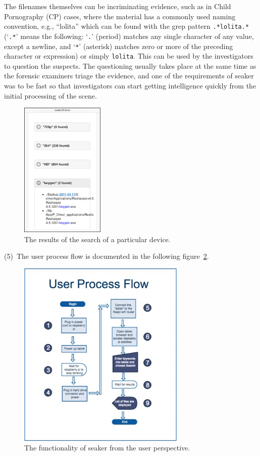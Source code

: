 \documentclass[12pt]{article}
\begin{document}
The filenames themselves can be incriminating evidence, such as in
Child Pornography (CP) cases, where the material has a commonly used
naming convention, e.g., ``lolita'' which can be found with the grep
pattern \verb|.*lolita.*| (`\verb|.*|' means the
following: `\verb|.|' (period)  matches any single character of any
value, except
a newline, and `\verb|*|' (asterisk) matches zero or more of the
preceding character or expression) or simply \verb|lolita|.
This can be used by the
investigators to question the suspects.  The questioning usually
takes place at the same time as the forensic examiners triage the
evidence, and one of the requirements of \gls{seaker} was to be fast so that
investigators can start getting intelligence quickly from the initial
processing of the scene.

\newpage

\begin{figure}[ht]
  \begin{center}
  \includegraphics[width=4cm]{images/seaker-hh-screen-3.jpg}
  \caption{The results of the search of a particular device.}
  \label{fig:screen-3}
  \end{center}
\end{figure}

\newpage
(5)~The user process flow is documented in the following
figure~\ref{fig:user_process_flow}.

\begin{figure}[ht]
  \begin{center}
  \includegraphics[width=8cm]{images/user_process_flow.jpg}
  \caption{The functionality of \gls{seaker} from the user perspective.}
  \label{fig:user_process_flow}
  \end{center}
\end{figure}
\end{document}
